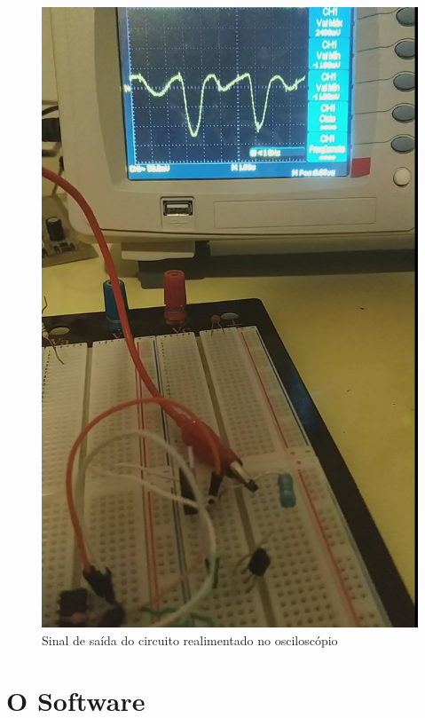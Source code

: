\begin{figure}[h!]
	\begin{center}
		\includegraphics[width=1\linewidth]{images/sinal_osciloscopio.png}
		\caption{Sinal de saída do circuito realimentado no osciloscópio}
		\label{fig:sinal_osciloscopio}
	\end{center}
\end{figure}
\FloatBarrier


 
\section{O Software}

